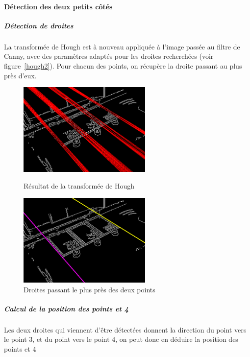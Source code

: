\documentclass{article}
\begin{document}
\paragraph{Détection des deux petits côtés}
\subparagraph{Détection de droites}
La transformée de Hough est à nouveau appliquée à l’image passée au filtre de Canny, avec des paramètres adaptés pour
les droites recherchées (voir figure~\ref{hough2}).
Pour chacun des points, on récupère la droite passant au plus près d’eux.
\begin{figure}[!h] \hfill
  \begin{minipage}[t]{.4\linewidth}
    \begin{center}
    \includegraphics[height=130pt]{image_Canny_et_hough2.png}  
    \end{center}
    \caption{Résultat de la transformée de Hough}
    \label{hough2}
  \end{minipage} \hfill
  \begin{minipage}[t]{.4\linewidth}
    \begin{center}
    \includegraphics[height=130pt]{image_Canny_hough2_et_droites_choisies.png}  
    \end{center}
    \caption{Droites passant le plus près des deux points}
    \label{hough2bis}
  \end{minipage} \hfill\hfill
\end{figure}

\subparagraph{Calcul de la position des points  et 4}
Les deux droites qui viennent d’être détectées donnent la direction du point  vers le point 3, et du point  vers le point 4,
on peut donc en déduire la position des points  et 4
\end{document}
